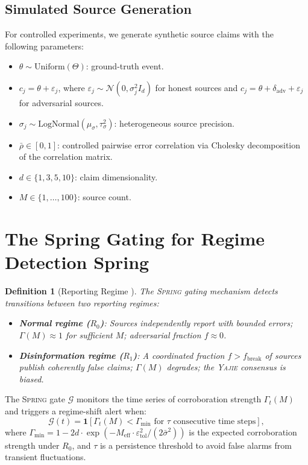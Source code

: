 \documentclass[11pt,a4paper]{article}
\newtheorem{definition}[theorem]{Definition}
\theoremstyle{definition}
\newcommand{\Yajie}{\textsc{Yajie}}
\newcommand{\Spring}{\textsc{Spring}}
\newcommand{\ind}[1]{\mathbf{1}[#1]}
\newcommand{\newsState}{\Theta}
\begin{document}
\subsection{Simulated Source Generation}

For controlled experiments, we generate synthetic source claims with the following parameters:
\begin{itemize}
    \item $\theta \sim \text{Uniform}(\newsState)$: ground-truth event.
    \item $c_j = \theta + \varepsilon_j$, where $\varepsilon_j \sim \mathcal{N}(0, \sigma_j^2 I_d)$ for honest sources and $c_j = \theta + \delta_{\mathrm{adv}} + \varepsilon_j$ for adversarial sources.
    \item $\sigma_j \sim \text{LogNormal}(\mu_\sigma, \tau_\sigma^2)$: heterogeneous source precision.
    \item $\bar{\rho} \in [0, 1]$: controlled pairwise error correlation via Cholesky decomposition of the correlation matrix.
    \item $d \in \{1, 3, 5, 10\}$: claim dimensionality.
    \item $M \in \{1, \ldots, 100\}$: source count.
\end{itemize}

\section{The Spring Gating for Regime Detection Spring}
\label{sec:spring}

\begin{definition}[Reporting Regime ]
\label{def:regime}
The \Spring{} gating mechanism detects transitions between two reporting regimes:
\begin{itemize}
    \item \textbf{Normal regime  ($R_0$)}: Sources independently report with bounded errors; $\Gamma(M) \approx 1$ for sufficient $M$; adversarial fraction $f \approx 0$.
    \item \textbf{Disinformation regime  ($R_1$)}: A coordinated fraction $f > f_{\mathrm{break}}$ of sources publish coherently false claims; $\Gamma(M)$ degrades; the \Yajie{} consensus is biased.
\end{itemize}
\end{definition}

The \Spring{} gate $\mathcal{G}$ monitors the time series of corroboration strength $\Gamma_t(M)$ and triggers a regime-shift alert when:
\begin{equation}
    \mathcal{G}(t) = \ind{\Gamma_t(M) < \Gamma_{\min} \text{ for } \tau \text{ consecutive time steps}},
    \label{eq:spring_gate}
\end{equation}
where $\Gamma_{\min} = 1 - 2d \cdot \exp(-M_{\mathrm{eff}} \cdot \varepsilon_{\mathrm{tol}}^2 / (2\bar{\sigma}^2))$ is the expected corroboration strength under $R_0$, and $\tau$ is a persistence threshold to avoid false alarms from transient fluctuations.
\end{document}
